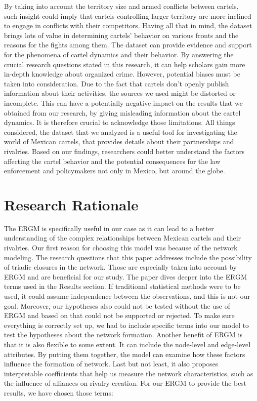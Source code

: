 \documentclass[
]{article}
\begin{document}
By taking into account the territory size and armed conflicts between
cartels, such insight could imply that cartels controlling larger
territory are more inclined to engage in conflicts with their
competitors. Having all that in mind, the dataset brings lots of value
in determining cartels' behavior on various fronts and the reasons for
the fights among them. The dataset can provide evidence and support for
the phenomena of cartel dynamics and their behavior. By answering the
crucial research questions stated in this research, it can help scholars
gain more in-depth knowledge about organized crime. However, potential
biases must be taken into consideration. Due to the fact that cartels
don't openly publish information about their activities, the sources we
used might be distorted or incomplete. This can have a potentially
negative impact on the results that we obtained from our research, by
giving misleading information about the cartel dynamics. It is therefore
crucial to acknowledge those limitations. All things considered, the
dataset that we analyzed is a useful tool for investigating the world of
Mexican cartels, that provides details about their partnerships and
rivalries. Based on our findings, researchers could better understand
the factors affecting the cartel behavior and the potential consequences
for the law enforcement and policymakers not only in Mexico, but around
the globe.

\section{Research Rationale}\label{research-rationale}

The ERGM is specifically useful in our case as it can lead to a better
understanding of the complex relationships between Mexican cartels and
their rivalries. Our first reason for choosing this model was because of
the network modeling. The research questions that this paper addresses
include the possibility of triadic closures in the network. Those are
especially taken into account by ERGM and are beneficial for our study.
The paper dives deeper into the ERGM terms used in the Results section.
If traditional statistical methods were to be used, it could assume
independence between the observations, and this is not our goal.
Moreover, our hypotheses also could not be tested without the use of
ERGM and based on that could not be supported or rejected. To make sure
everything is correctly set up, we had to include specific terms into
our model to test the hypotheses about the network formation. Another
benefit of ERGM is that it is also flexible to some extent. It can
include the node-level and edge-level attributes. By putting them
together, the model can examine how these factors influence the
formation of network. Last but not least, it also proposes interpretable
coefficients that help us measure the network characteristics, such as
the influence of alliances on rivalry creation. For our ERGM to provide
the best results, we have chosen those terms:
\end{document}
